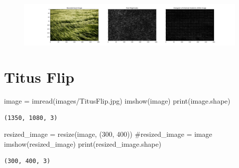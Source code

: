 \documentclass[
  letterpaper,
  DIV=11,
  numbers=noendperiod]{scrreprt}
\newenvironment{Shaded}{\begin{snugshade}}{\end{snugshade}}
\newcommand{\BuiltInTok}[1]{\textcolor[rgb]{0.00,0.23,0.31}{#1}}
\newcommand{\CommentTok}[1]{\textcolor[rgb]{0.37,0.37,0.37}{#1}}
\newcommand{\DecValTok}[1]{\textcolor[rgb]{0.68,0.00,0.00}{#1}}
\newcommand{\NormalTok}[1]{\textcolor[rgb]{0.00,0.23,0.31}{#1}}
\newcommand{\OperatorTok}[1]{\textcolor[rgb]{0.37,0.37,0.37}{#1}}
\newcommand{\StringTok}[1]{\textcolor[rgb]{0.13,0.47,0.30}{#1}}
\begin{document}
\begin{figure}[H]

{\centering \includegraphics{results_files/figure-pdf/unnamed-chunk-33-6.pdf}

}

\end{figure}

\hypertarget{titus-flip}{%
\section{Titus Flip}\label{titus-flip}}

\begin{Shaded}
\begin{Highlighting}[]
\NormalTok{image }\OperatorTok{=}\NormalTok{ imread(}\StringTok{\textquotesingle{}images/TitusFlip.jpg\textquotesingle{}}\NormalTok{)}
\NormalTok{imshow(image)}
\BuiltInTok{print}\NormalTok{(image.shape)}
\end{Highlighting}
\end{Shaded}

\begin{verbatim}
(1350, 1080, 3)
\end{verbatim}

\begin{Shaded}
\begin{Highlighting}[]
\NormalTok{resized\_image }\OperatorTok{=}\NormalTok{ resize(image, (}\DecValTok{300}\NormalTok{, }\DecValTok{400}\NormalTok{))}
\CommentTok{\#resized\_image = image}
\NormalTok{imshow(resized\_image)}
\BuiltInTok{print}\NormalTok{(resized\_image.shape)}
\end{Highlighting}
\end{Shaded}

\begin{verbatim}
(300, 400, 3)
\end{verbatim}
\end{document}
